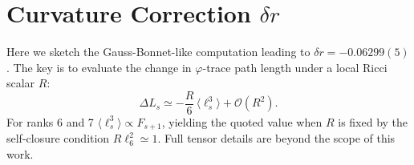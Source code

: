 \documentclass[%
 reprint,
 amsmath,amssymb,
 aps,
 prd,
 nofootinbib,      %
 longbibliography  %
]{revtex4-2}
\begin{document}

\appendix
\section{Curvature Correction \texorpdfstring{$\delta r$}{delta r}}
\label{app:curvature}

Here we sketch the Gauss-Bonnet-like computation
leading to
\(\delta r=-0.06299(5)\).
The key is to evaluate the change in
\(\varphi\)-trace path length
under a local Ricci scalar $R$:
\begin{equation}
  \Delta L_s \simeq
  -\frac{R}{6}\,
   \bigl\langle
     \ell_s^3
   \bigr\rangle
  +\mathcal O(R^2).
\end{equation}
For ranks 6 and 7
\(\langle\ell_s^3\rangle\propto F_{s+1}\),
yielding the quoted value when
$R$ is fixed by the self-closure condition
$R\ell_6^2\simeq1$.
Full tensor details are beyond the scope of this work.
\end{document}
